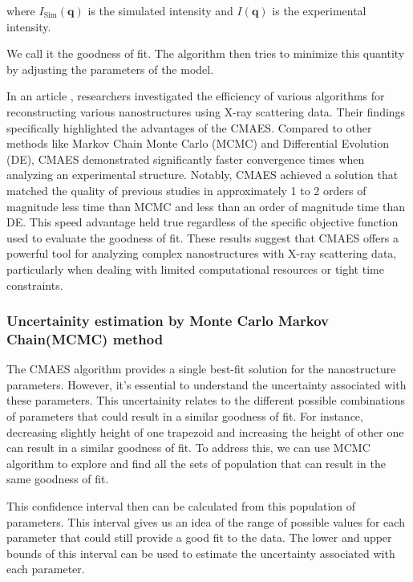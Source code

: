 \medskip

where $I_{\mathrm{Sim}}(\mathbf{q})$ is the simulated intensity and $I(\mathbf{q})$ is the experimental intensity.

\medskip

We call it the goodness of fit. The algorithm then tries to minimize this quantity by adjusting the parameters of the model.

\medskip

In an article \cite{hannon2016advancing}, researchers investigated the efficiency of various algorithms
for reconstructing various nanostructures using X-ray scattering data.
Their findings specifically highlighted the advantages of the CMAES. Compared to other
methods like Markov Chain Monte Carlo (MCMC) and Differential Evolution 
(DE), CMAES demonstrated significantly faster convergence times when 
analyzing an experimental structure. Notably, CMAES achieved a solution 
that matched the quality of previous studies in approximately 1 to 2 
orders of magnitude less time than MCMC and less than an order of 
magnitude time than DE. This speed advantage held true regardless 
of the specific objective function used to evaluate the goodness of fit. 
These results suggest that CMAES offers a powerful tool for analyzing 
complex nanostructures with X-ray scattering data, particularly when 
dealing with limited computational resources or tight time constraints.

\subsubsection{Uncertainity estimation by Monte Carlo Markov Chain(MCMC) method}
\label{sec:mcmc_cdsaxs}

The CMAES algorithm provides a single best-fit solution for the nanostructure parameters. However, it's essential to understand the uncertainty associated with these parameters.
This uncertainity relates to the different possible combinations of parameters that could result in a similar goodness of fit. 
For instance, decreasing slightly height of one trapezoid and increasing the height of other one can result in a similar goodness of fit.
To address this, we can use MCMC algorithm to explore and find all the sets of population that can result in the same goodness of fit.

\medskip

This confidence interval then can be calculated from this population of parameters. This interval gives us an idea of the range of possible values for each parameter that could still provide a good fit to the data.
The lower and upper bounds of this interval can be used to estimate the uncertainty associated with each parameter.

